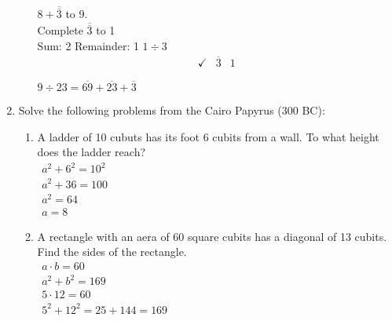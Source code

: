 \documentclass[12pt]{article}
\begin{document}
\begin{enumerate}[label=\textbf{\arabic*}.]
\begin{enumerate}
\begin{tasks}[label=]
         $8 + \overline{\overline{3}}$ to 9.\\
        Complete $\overline{\overline3}$ to 1 \\
        Sum: 2 Remainder: 1
        $1 \div 3$
        \begin{align*}
            \checkmark&\overline{3} & 1
        \end{align*}
    \end{tasks}
    $9 \div 23 = \overline{69} + \overline{23} + \overline3$
\end{enumerate}
    \item Solve the following problems from the Cairo Papyrus (300 BC):
    \begin{enumerate}
        \item A ladder of 10 cubuts has its foot 6 cubits from a wall. To what height does the 
        ladder reach? \\
        \(\begin{aligned}
            a^2 + 6^2 = 10^2 \\
            a^2 + 36 = 100 \\
            a^2 = 64 \\
            a = 8
        \end{aligned} \) \qquad \qquad \qquad \qquad
        \item A rectangle with an aera of 60 square cubits has a diagonal of 13 cubits. Find 
        the sides of the rectangle. \\
        \(\begin{aligned}
            a \cdot b = 60 \\
            a^2 + b^2 = 169\\
            5 \cdot 12 = 60\\ 
            5^2 + 12 ^2 = 25 + 144 = 169
        \end{aligned}\) \qquad \qquad \qquad 

\end{enumerate}
\end{enumerate}
\end{document}
